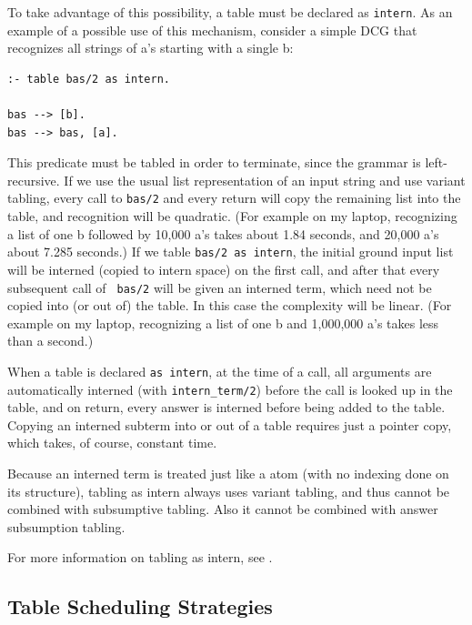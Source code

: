 To take advantage of this possibility, a table must be declared as
{\tt intern}.  As an example of a possible use of this mechanism,
consider a simple DCG that recognizes all strings of a's starting with
a single b:
\begin{verbatim}
:- table bas/2 as intern.

bas --> [b].
bas --> bas, [a].
\end{verbatim}
This predicate must be tabled in order to terminate, since the grammar
is left-recursive.  If we use the usual list representation of an
input string and use variant tabling, every call to {\tt bas/2} and
every return will copy the remaining list into the table, and
recognition will be quadratic.  (For example on my laptop, recognizing
a list of one b followed by 10,000 a's takes about 1.84 seconds, and
20,000 a's about 7.285 seconds.)  If we table {\tt bas/2 as intern},
the initial ground input list will be interned (copied to intern
space) on the first call, and after that every subsequent call of {\tt
bas/2} will be given an interned term, which need not be copied into
(or out of) the table.  In this case the complexity will be linear.
(For example on my laptop, recognizing a list of one b and 1,000,000
a's takes less than a second.)

When a table is declared {\tt as intern}, at the time of a call, all
arguments are automatically interned (with {\tt intern\_term/2})
before the call is looked up in the table, and on return, every answer
is interned before being added to the table.  Copying an interned
subterm into or out of a table requires just a pointer copy, which takes,
of course, constant time.

Because an interned term is treated just like a atom (with no indexing
done on its structure), tabling as intern always uses variant tabling,
and thus cannot be combined with subsumptive tabling.  Also it cannot
be combined with answer subsumption tabling.

For more information on tabling as intern, see
\cite{ciclops-2013-interning}.



\subsection{Table Scheduling Strategies} \label{section:scheduling}

